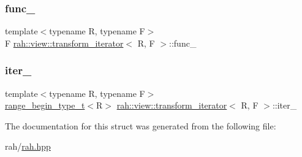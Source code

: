 \subsubsection{\texorpdfstring{func\_}{func\_}}
{\footnotesize\ttfamily template$<$typename R, typename F$>$ \\
F \mbox{\hyperlink{structrah_1_1view_1_1transform__iterator}{rah\+::view\+::transform\+\_\+iterator}}$<$ R, F $>$\+::func\+\_\+}

\mbox{\label{structrah_1_1view_1_1transform__iterator_ac3c20401254ca24682913ba0e9c56284}} 
\subsubsection{\texorpdfstring{iter\_}{iter\_}}
{\footnotesize\ttfamily template$<$typename R, typename F$>$ \\
\mbox{\hyperlink{namespacerah_a28aff4eeddcece6be65ff0b956d32d4a}{range\+\_\+begin\+\_\+type\+\_\+t}}$<$R$>$ \mbox{\hyperlink{structrah_1_1view_1_1transform__iterator}{rah\+::view\+::transform\+\_\+iterator}}$<$ R, F $>$\+::iter\+\_\+}



The documentation for this struct was generated from the following file\+:\begin{DoxyCompactItemize}
\item 
rah/\mbox{\hyperlink{rah_8hpp}{rah.\+hpp}}\end{DoxyCompactItemize}
